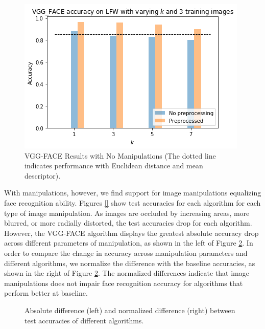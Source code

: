 \documentclass[pageno]{cos429}
\begin{document}
\begin{figure}
\centering
\includegraphics[scale=0.5]{../figures/results_plots/vgg_1.png}
\caption{VGG-FACE Results with No Manipulations (The dotted line indicates performance with Euclidean distance and mean descriptor).}
\label{fig:vgg_nonmanipulated}
\end{figure}

With manipulations, however, we find support for image manipulations equalizing face recognition ability. Figures \ref{} show test accuracies for each algorithm for each type of image manipulation. As images are occluded by increasing areas, more blurred, or more radially distorted, the test accuracies drop for each algorithm. However, the VGG-FACE algorithm displays the greatest absolute accuracy drop across different parameters of manipulation, as shown in the left of Figure \ref{fig:results_diff}. In order to compare the change in accuracy across manipulation parameters and different algorithms, we normalize the difference with the baseline accuracies, as shown in the right of Figure \ref{fig:results_diff}. The normalized differences indicate that image manipulations does not impair face recognition accuracy for algorithms that perform better at baseline.

\begin{figure}[ht]
\centering
{}
\caption{Absolute difference (left) and normalized difference (right) between test accuracies of different algorithms.}
\label{fig:results_diff}
\end{figure}
\end{document}
